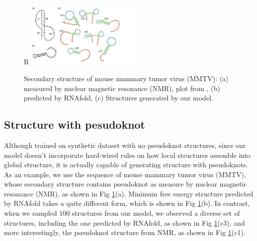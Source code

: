 \documentclass{article}
\begin{document}
\begin{figure}{R}
    \centering
    \includegraphics[width=0.5\textwidth]{plot/sample_structure_pseudoknot.pdf}
    \caption{Secondary structure of mouse mammary tumor virus (MMTV): (a) measured by nuclear magnetic resonance (NMR), plot from \cite{staple2005pseudoknots}, (b) predicted by RNAfold, (c) Structures generated by our model.}
    \label{fig:sample_structure_pseudoknot}
    \centering
\end{figure}





\subsection{Structure with pesudoknot}

Although trained on synthetic dataset with no pseudoknot structures,
since our model doesn't incorporate hard-wired rules on how local structures assemble into global structure,
it is actually capable of generating structure with pseudoknots.
As an example, we use the sequence of mouse mammary tumor virus (MMTV), whose secondary structure
contains pseudoknot as measure by nuclear magnetic resonance (NMR), as shown in Fig \ref{fig:sample_structure_pseudoknot}(a).
Minimum free energy structure predicted by RNAfold takes a quite different form, which is shown in Fig \ref{fig:sample_structure_pseudoknot}(b).
In contrast, when we sampled $100$ structures from our model, we observed a diverse set of structures,
including the one predicted by RNAfold, as shown in Fig \ref{fig:sample_structure_pseudoknot}(c3),
and more interestingly, the pseudoknot structure from NMR, as shown in Fig \ref{fig:sample_structure_pseudoknot}(c1).



\end{document}

